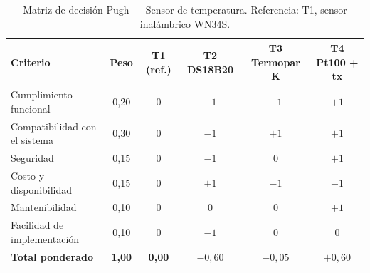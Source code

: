 \begin{table}[H]
\centering
\caption{Matriz de decisión Pugh --- Sensor de temperatura. Referencia: T1, sensor inalámbrico WN34S.}
\label{tab:pugh-temperatura}

\begin{tabularx}{\textwidth}{Xccccc}
\toprule
\textbf{Criterio} & \textbf{Peso} & \textbf{T1 (ref.)} & \textbf{T2 DS18B20} & \textbf{T3 Termopar K} & \textbf{T4 Pt100 + tx} \\
\midrule

Cumplimiento funcional
& 0,20 & 0 & $-1$ & $-1$ & $+1$ \\

Compatibilidad con el sistema
& 0,30 & 0 & $-1$ & $+1$ & $+1$ \\

Seguridad
& 0,15 & 0 & $-1$ & 0 & $+1$ \\

Costo y disponibilidad
& 0,15 & 0 & $+1$ & $-1$ & $-1$ \\

Mantenibilidad
& 0,10 & 0 & 0 & 0 & $+1$ \\

Facilidad de implementación
& 0,10 & 0 & $-1$ & 0 & 0 \\

\midrule

\textbf{Total ponderado}
& \textbf{1,00}
& \textbf{0,00}
& \textbf{$-0,60$}
& \textbf{$-0,05$}
& \textbf{$+0,60$} \\

\bottomrule
\end{tabularx}
\end{table}
